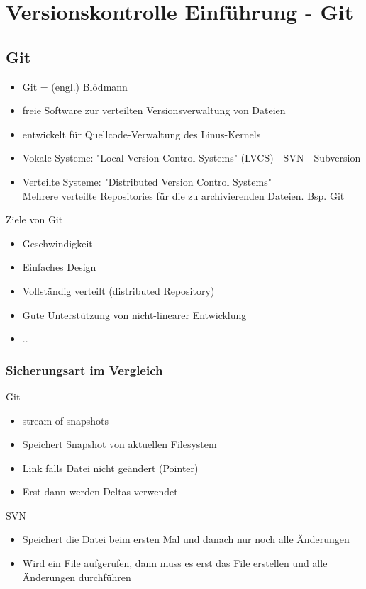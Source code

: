 \chapter{Versionskontrolle Einführung - Git}

\section{Git}
\begin{itemize}
	\item Git = (engl.) Blödmann
	\item freie Software zur verteilten Versionsverwaltung von Dateien
	\item entwickelt für Quellcode-Verwaltung des Linus-Kernels
	\item Vokale Systeme: "Local Version Control Systems" (LVCS) -  SVN - Subversion \\
	\item Verteilte Systeme: "Distributed Version Control Systems" \\
	Mehrere verteilte Repositories für die zu archivierenden Dateien. 
	Bsp. Git \\
\end{itemize}

Ziele von Git
\begin{itemize}
	\item Geschwindigkeit
	\item Einfaches Design
	\item Vollständig verteilt (distributed Repository)
	\item Gute Unterstützung von nicht-linearer Entwicklung 
	\item ..
\end{itemize}

\subsection{Sicherungsart im Vergleich}
Git
\begin{itemize}
	\item stream of snapshots
	\item Speichert Snapshot von aktuellen Filesystem
	\item Link falls Datei nicht geändert (Pointer)
	\item Erst dann werden Deltas verwendet
\end{itemize}

SVN
\begin{itemize}
	\item Speichert die Datei beim ersten Mal und danach nur noch alle Änderungen
	\item Wird ein File aufgerufen, dann muss es erst das File erstellen und alle Änderungen durchführen
\end{itemize}

